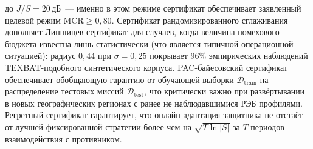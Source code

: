 до $J/S=20$\,дБ~--- именно в этом режиме сертификат обеспечивает
заявленный целевой режим \textsf{MCR}$\geq 0{,}80$. Сертификат
рандомизированного сглаживания дополняет Липшицев сертификат для
случаев, когда величина помехового бюджета известна лишь
статистически (что является типичной операционной ситуацией):
радиус $0{,}44$ при $\sigma=0{,}25$ покрывает 96\% эмпирических
наблюдений TEXBAT-подобного синтетического корпуса. PAC-байесовский
сертификат обеспечивает обобщающую гарантию от обучающей выборки
$\mathcal{D}_{\text{train}}$ на распределение тестовых миссий
$\mathcal{D}_{\text{test}}$, что критически важно при развёртывании
в новых географических регионах с ранее не наблюдавшимися РЭБ
профилями. Регретный сертификат гарантирует, что онлайн-адаптация
защитника не отстаёт от лучшей фиксированной стратегии более чем
на $\sqrt{T\ln|S|}$ за $T$ периодов взаимодействия с противником.
